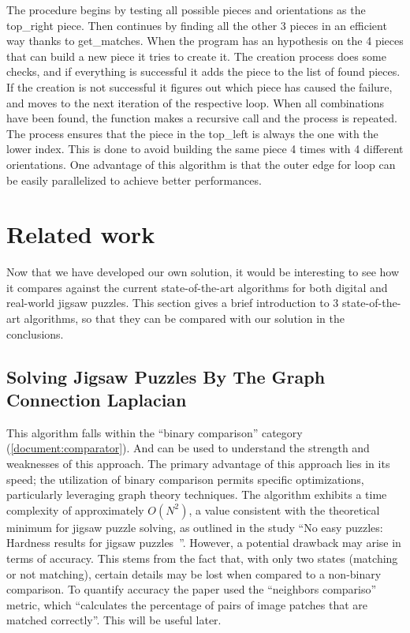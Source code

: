 \documentclass{article}
\begin{document}
The procedure begins by testing all possible pieces and orientations as the top\_right piece.
Then continues by finding all the other 3 pieces in an efficient way thanks to get\_matches.
When the program has an hypothesis on the 4 pieces that can build a new piece it tries to create it.\newline
The creation process does some checks, and if everything is successful it adds the piece to the list of found pieces.
If the creation is not successful it figures out which piece has caused the failure, and moves to the next iteration of the respective loop.\newline
When all combinations have been found, the function makes a recursive call and the process is repeated.\newline
The process ensures that the piece in the top\_left is always the one with the lower index.
This is done to avoid building the same piece 4 times with 4 different orientations.\newline
One advantage of this algorithm is that the outer edge for loop can be easily parallelized to achieve better performances.


\section{Related work}\label{document:related_work}
Now that we have developed our own solution, it would be
interesting to see how it compares against the current
state-of-the-art algorithms for both digital and real-world
jigsaw puzzles. This section gives a brief introduction to 3
state-of-the-art algorithms, so that they can be compared with
our solution in the conclusions.

\subsection{Solving Jigsaw Puzzles By The Graph Connection Laplacian~\cite{GCL}}
This algorithm falls within the ``binary comparison'' category (\cref{document:comparator}).
And can be used to understand the strength and weaknesses
of this approach.\newline
The primary advantage of this approach lies in its speed;
the utilization of binary comparison permits specific optimizations,
particularly leveraging graph theory techniques.\newline
The algorithm exhibits a time complexity of approximately \(O(N^2)\),
a value consistent with the theoretical minimum for
jigsaw puzzle solving, as outlined in the study
``No easy puzzles: Hardness results for jigsaw puzzles~\cite{ON2Claim}''.\newline
However, a potential drawback may arise in terms of accuracy.
This stems from the fact that, with only two states
(matching or not matching),
certain details may be lost when compared to a non-binary comparison. 
To quantify accuracy the paper used the ``neighbors compariso'' metric,
which ``calculates the percentage of pairs of image patches that are matched correctly''.
This will be useful later.\label{document:GCL}
\end{document}
